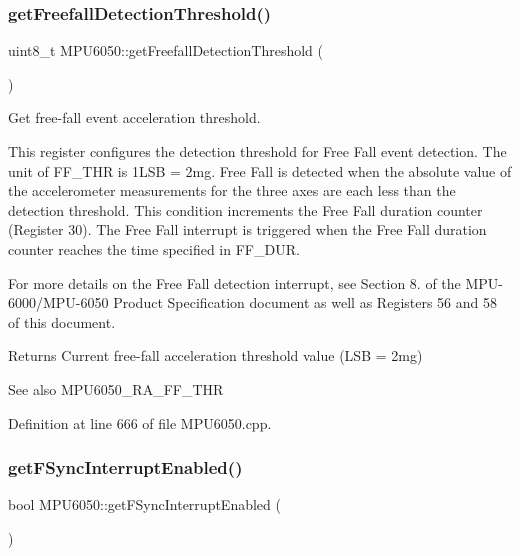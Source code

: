 \subsubsection{\texorpdfstring{getFreefallDetectionThreshold()}{getFreefallDetectionThreshold()}}
{\footnotesize\ttfamily uint8\+\_\+t M\+P\+U6050\+::get\+Freefall\+Detection\+Threshold (\begin{DoxyParamCaption}{ }\end{DoxyParamCaption})}



Get free-\/fall event acceleration threshold. 

This register configures the detection threshold for Free Fall event detection. The unit of F\+F\+\_\+\+T\+HR is 1L\+SB = 2mg. Free Fall is detected when the absolute value of the accelerometer measurements for the three axes are each less than the detection threshold. This condition increments the Free Fall duration counter (Register 30). The Free Fall interrupt is triggered when the Free Fall duration counter reaches the time specified in F\+F\+\_\+\+D\+UR.

For more details on the Free Fall detection interrupt, see Section 8. of the M\+P\+U-\/6000/\+M\+P\+U-\/6050 Product Specification document as well as Registers 56 and 58 of this document.

\begin{DoxyReturn}{Returns}
Current free-\/fall acceleration threshold value (L\+SB = 2mg) 
\end{DoxyReturn}
\begin{DoxySeeAlso}{See also}
M\+P\+U6050\+\_\+\+R\+A\+\_\+\+F\+F\+\_\+\+T\+HR 
\end{DoxySeeAlso}


Definition at line 666 of file M\+P\+U6050.\+cpp.

\mbox{\label{classMPU6050_a4c01f9ab83b64dbbc6b62e658c3d3d9b}} 
\subsubsection{\texorpdfstring{getFSyncInterruptEnabled()}{getFSyncInterruptEnabled()}}
{\footnotesize\ttfamily bool M\+P\+U6050\+::get\+F\+Sync\+Interrupt\+Enabled (\begin{DoxyParamCaption}{ }\end{DoxyParamCaption})}



